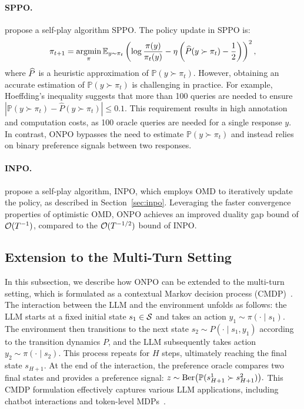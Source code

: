 \paragraph{SPPO.}\citet{wu2024self} propose a self-play algorithm SPPO. The policy update in SPPO is:
{\small
\begin{align*}
\pi_{t+1}=\argmin_{\pi} \E_{y \sim \pi_t}\pa{\log \frac{\pi(y)}{\pi_t(y)} - \eta \pa{\widehat P(y \succ \pi_t) - \frac{1}{2}}}^2,
\end{align*}}
where $\wh{P}$ is a heuristic approximation of $\mathbb{P}(y \succ \pi_t)$. However, obtaining an accurate estimation of $\mathbb{P}(y \succ \pi_t)$ is challenging in practice. For example, Hoeffding’s inequality suggests that more than 100 queries are needed to ensure $\left|\mathbb{P}(y \succ \pi_t) - \widehat{P}(y \succ \pi_t)\right| \leq 0.1$. This requirement results in high annotation and computation costs, as 100 oracle queries are needed for a single response $y$. In contrast, ONPO bypasses the need to estimate $\mathbb{P}(y \succ \pi_t)$ and instead relies on binary preference signals between two responses.

\paragraph{INPO.}\citet{zhang2024iterative} propose a self-play algorithm, INPO, which employs OMD to iteratively update the policy, as described in Section~\ref{sec:inpo}. Leveraging the faster convergence properties of optimistic OMD, ONPO achieves an improved duality gap bound of $\Ocal(T^{-1})$, compared to the $\Ocal(T^{-1/2})$ bound of INPO.

\subsection{Extension to the Multi-Turn Setting}  
In this subsection, we describe how ONPO can be extended to the multi-turn setting, which is formulated as a contextual Markov decision process (CMDP)~\citep{shani2024multi}. The interaction between the LLM and the environment unfolds as follows: the LLM starts at a fixed initial state $s_1 \in \Scal$ and takes an action $y_1 \sim \pi(\cdot \mid s_1)$. The environment then transitions to the next state $s_2 \sim P(\cdot \mid s_1, y_1)$ according to the transition dynamics $P$, and the LLM subsequently takes action $y_2 \sim \pi(\cdot \mid s_2)$. This process repeats for $H$ steps, ultimately reaching the final state $s_{H+1}$. At the end of the interaction, the preference oracle compares two final states and provides a preference signal:  
$
z \sim \mathrm{Ber}\big(\P(s_{H+1}^1 \succ s_{H+1}^2 )\big).
$
This CMDP formulation effectively captures various LLM applications, including chatbot interactions and token-level MDPs~\citep{rafailov2024r}.



